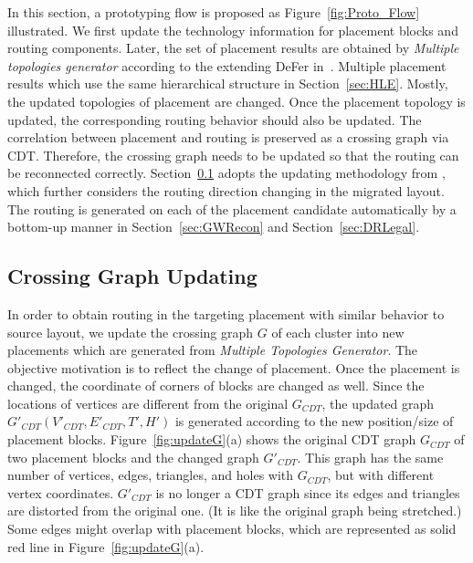    In this section, a prototyping flow is proposed as Figure~\ref{fig:Proto_Flow} illustrated. We first update the technology information for placement blocks and routing components. Later, the set of placement results are obtained by \textit{Multiple topologies generator} according to the extending DeFer in~\cite{ALP_YPWeng_iccad2011}. Multiple placement results which use the same hierarchical structure in Section~\ref{sec:HLE}. Mostly, the updated topologies of placement are changed. Once the placement topology is updated, the corresponding routing behavior should also be updated. The correlation between placement and routing is preserved as a crossing graph via CDT. Therefore, the crossing graph needs to be updated so that the routing can be reconnected correctly. Section~\ref{sec:updateG} adopts the updating methodology from \cite{Chin_DMR_ICCAD2013}, which further considers the routing direction changing in the migrated layout. The routing is generated on each of the placement candidate automatically by a bottom-up manner in Section~\ref{sec:GWRecon} and Section~\ref{sec:DRLegal}. 

    \subsection{Crossing Graph Updating}\label{sec:updateG}


      In order to obtain routing in the targeting placement with similar behavior to source layout, we update the crossing graph $G$ of each cluster into new placements which are generated from {\it Multiple Topologies Generator}. The objective motivation is to reflect the change of placement. Once the placement is changed, the coordinate of corners of blocks are changed as well. Since the locations of vertices are different from the original $G_{CDT}$, the updated graph $G'_{CDT}(V'_{CDT},E'_{CDT},T',H')$ is generated according to the new position/size of placement blocks. Figure~\ref{fig:updateG}(a) shows the original CDT graph $G_{CDT}$ of two placement blocks and the changed graph $G'_{CDT}$. This graph has the same number of vertices, edges, triangles, and holes with $G_{CDT}$, but with different vertex coordinates. $G'_{CDT}$ is no longer a CDT graph since its edges and triangles are distorted from the original one. (It is like the original graph being stretched.) Some edges might overlap with placement blocks, which are represented as solid red line in Figure~\ref{fig:updateG}(a).


